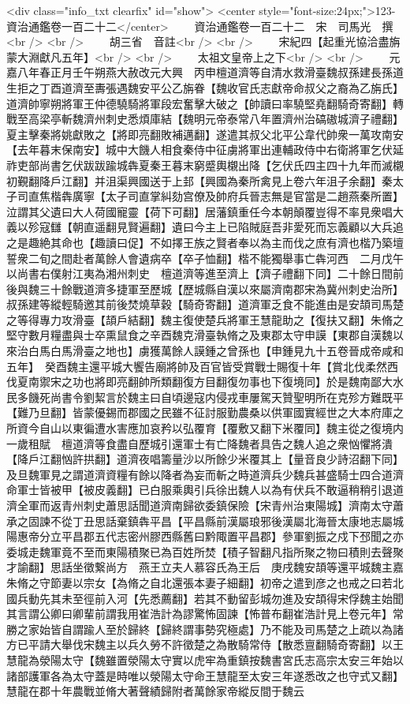 <div class="info_txt clearfix" id="show">
<center style="font-size:24px;">123-資治通鑑卷一百二十二</center>
  　　資治通鑑卷一百二十二　宋　司馬光　撰<br />
<br />
　　胡三省　音註<br />
<br />
　　宋紀四【起重光協洽盡旃蒙大淵獻凡五年】<br />
<br />
　　太祖文皇帝上之下<br />
<br />
　　元嘉八年春正月壬午朔燕大赦改元大興　丙申檀道濟等自清水救滑臺魏叔孫建長孫道生拒之丁酉道濟至夀張遇魏安平公乙旃眷【魏收官氏志獻帝命叔父之裔為乙旃氏】道濟帥寧朔將軍王仲德驍騎將軍段宏奮擊大破之【帥讀曰率驍堅堯翻騎奇寄翻】轉戰至高梁亭斬魏濟州刺史悉煩庫結【魏明元帝泰常八年置濟州治碻磝城濟子禮翻】　夏主擊秦將姚獻敗之【將即亮翻敗補邁翻】遂遣其叔父北平公韋代帥衆一萬攻南安【去年暮末保南安】城中大饑人相食秦侍中征虜將軍出連輔政侍中右衛將軍乞伏延祚吏部尚書乞伏跋跋踰城犇夏秦王暮末窮蹙輿櫬出降【乞伏氏四主四十九年而滅櫬初覲翻降戶江翻】并沮渠興國送于上邽【興國為秦所禽見上卷六年沮子余翻】秦太子司直焦楷犇廣寧【太子司直掌糾劾宫僚及帥府兵晉志無是官當是二趙燕秦所置】泣謂其父遺曰大人荷國寵靈【荷下可翻】居藩鎮重任今本朝顛覆豈得不率見衆唱大義以殄寇讎【朝直遥翻見賢遍翻】遺曰今主上已陷賊庭吾非愛死而忘義顧以大兵追之是趣絶其命也【趣讀曰促】不如擇王族之賢者奉以為主而伐之庶有濟也楷乃築壇誓衆二旬之間赴者萬餘人會遺病卒【卒子恤翻】楷不能獨舉事亡犇河西　二月戊午以尚書右僕射江夷為湘州刺史　檀道濟等進至濟上【濟子禮翻下同】二十餘日間前後與魏三十餘戰道濟多捷軍至歷城【歷城縣自漢以來屬濟南郡宋為冀州刺史治所】叔孫建等縱輕騎邀其前後焚燒草穀【騎奇寄翻】道濟軍乏食不能進由是安頡司馬楚之等得專力攻滑臺【頡戶結翻】魏主復使楚兵將軍王慧龍助之【復扶又翻】朱脩之堅守數月糧盡與士卒熏鼠食之辛酉魏克滑臺執脩之及東郡太守申謨【東郡自漢魏以來治白馬白馬滑臺之地也】虜獲萬餘人謨鍾之曾孫也【申鍾見九十五卷晉成帝咸和五年】　癸酉魏主還平城大饗告廟將帥及百官皆受賞戰士賜復十年【賞北伐柔然西伐夏南禦宋之功也將即亮翻帥所類翻復方目翻復勿事也下復境同】於是魏南鄙大水民多饑死尚書令劉絜言於魏主曰自頃邊寇内侵戎車屢駕天贊聖明所在克殄方難既平【難乃旦翻】皆蒙優錫而郡國之民雖不征討服勤農桑以供軍國實經世之大本府庫之所資今自山以東徧遭水害應加哀矜以弘覆育【覆敷又翻下米覆同】魏主從之復境内一歲租賦　檀道濟等食盡自歷城引還軍士有亡降魏者具告之魏人追之衆忷懼將潰【降戶江翻忷許拱翻】道濟夜唱籌量沙以所餘少米覆其上【量音良少詩沼翻下同】及旦魏軍見之謂道濟資糧有餘以降者為妄而斬之時道濟兵少魏兵甚盛騎士四合道濟命軍士皆被甲【被皮義翻】已白服乘輿引兵徐出魏人以為有伏兵不敢逼稍稍引退道濟全軍而返青州刺史蕭思話聞道濟南歸欲委鎮保險【宋青州治東陽城】濟南太守蕭承之固諫不從丁丑思話棄鎮犇平昌【平昌縣前漢屬琅邪後漢屬北海晉太康地志屬城陽惠帝分立平昌郡五代志密州膠西縣舊曰黔陬置平昌郡】參軍劉振之戍下邳聞之亦委城走魏軍竟不至而東陽積聚已為百姓所焚【積子智翻凡指所聚之物曰積則去聲聚才諭翻】思話坐徵繋尚方　燕王立夫人慕容氏為王后　庚戌魏安頡等還平城魏主嘉朱脩之守節妻以宗女【為脩之自北還張本妻子細翻】初帝之遣到彦之也戒之曰若北國兵動先其未至徑前入河【先悉薦翻】若其不動留彭城勿進及安頡得宋俘魏主始聞其言謂公卿曰卿輩前謂我用崔浩計為謬驚怖固諫【怖普布翻崔浩計見上卷元年】常勝之家始皆自謂踰人至於歸終【歸終謂事勢究極處】乃不能及司馬楚之上疏以為諸方已平請大舉伐宋魏主以兵久勞不許徵楚之為散騎常侍【散悉亶翻騎奇寄翻】以王慧龍為滎陽太守【魏雖置滎陽太守實以虎牢為重鎮按魏書宮氏志高宗太安三年始以諸部護軍各為太守蓋是時唯以滎陽太守命王慧龍至太安三年遂悉改之也守式又翻】慧龍在郡十年農戰並脩大著聲績歸附者萬餘家帝縱反間于魏云